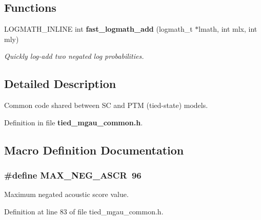 \subsection*{Functions}
\begin{DoxyCompactItemize}
\item 
L\-O\-G\-M\-A\-T\-H\-\_\-\-I\-N\-L\-I\-N\-E int {\bf fast\-\_\-logmath\-\_\-add} (logmath\-\_\-t $\ast$lmath, int mlx, int mly)
\begin{DoxyCompactList}\small\item\em Quickly log-\/add two negated log probabilities. \end{DoxyCompactList}\end{DoxyCompactItemize}


\subsection{Detailed Description}
Common code shared between S\-C and P\-T\-M (tied-\/state) models. 

Definition in file {\bf tied\-\_\-mgau\-\_\-common.\-h}.



\subsection{Macro Definition Documentation}
\subsubsection[{M\-A\-X\-\_\-\-N\-E\-G\-\_\-\-A\-S\-C\-R}]{\setlength{\rightskip}{0pt plus 5cm}\#define M\-A\-X\-\_\-\-N\-E\-G\-\_\-\-A\-S\-C\-R~96}\label{tied__mgau__common_8h_a965d50d73044c3f2dc2589662fd2e89e}


Maximum negated acoustic score value. 



Definition at line 83 of file tied\-\_\-mgau\-\_\-common.\-h.


